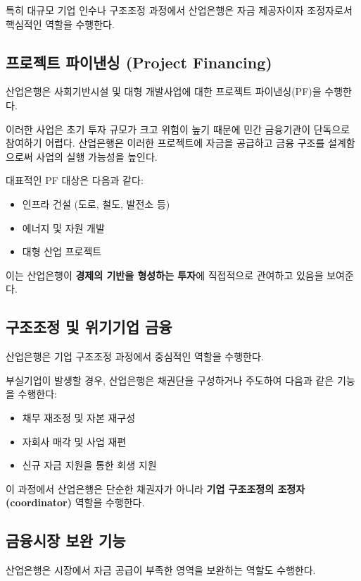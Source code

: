 특히 대규모 기업 인수나 구조조정 과정에서 산업은행은 자금 제공자이자 조정자로서 핵심적인 역할을 수행한다.

\subsection{프로젝트 파이낸싱 (Project Financing)}

산업은행은 사회기반시설 및 대형 개발사업에 대한 프로젝트 파이낸싱(PF)을 수행한다.

이러한 사업은 초기 투자 규모가 크고 위험이 높기 때문에 민간 금융기관이 단독으로 참여하기 어렵다.  
산업은행은 이러한 프로젝트에 자금을 공급하고 금융 구조를 설계함으로써 사업의 실행 가능성을 높인다.

대표적인 PF 대상은 다음과 같다:

\begin{itemize}
    \item 인프라 건설 (도로, 철도, 발전소 등)
    \item 에너지 및 자원 개발
    \item 대형 산업 프로젝트
\end{itemize}

이는 산업은행이 \textbf{경제의 기반을 형성하는 투자}에 직접적으로 관여하고 있음을 보여준다.

\subsection{구조조정 및 위기기업 금융}

산업은행은 기업 구조조정 과정에서 중심적인 역할을 수행한다.

부실기업이 발생할 경우, 산업은행은 채권단을 구성하거나 주도하여 다음과 같은 기능을 수행한다:

\begin{itemize}
    \item 채무 재조정 및 자본 재구성
    \item 자회사 매각 및 사업 재편
    \item 신규 자금 지원을 통한 회생 지원
\end{itemize}

이 과정에서 산업은행은 단순한 채권자가 아니라 \textbf{기업 구조조정의 조정자(coordinator)} 역할을 수행한다.

\subsection{금융시장 보완 기능}

산업은행은 시장에서 자금 공급이 부족한 영역을 보완하는 역할도 수행한다.

